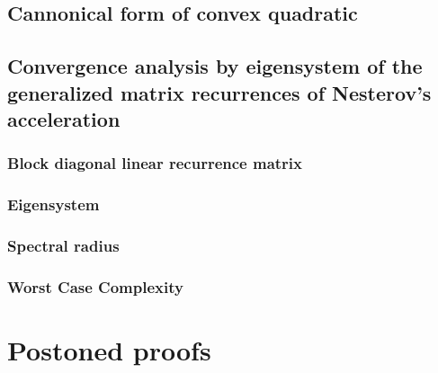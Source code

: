 \documentclass[12pt]{article}
\begin{document}
    \subsection{Cannonical form of convex quadratic}\label{sec:cannonical-convex-quadratic}
        
    
    \subsection{Convergence analysis by eigensystem of the generalized matrix recurrences of Nesterov's acceleration}\label{sec:convergence-by-eigensystem}
        \subsubsection{Block diagonal linear recurrence matrix}
        \subsubsection{Eigensystem}
        \subsubsection{Spectral radius}
        \subsubsection{Worst Case Complexity}








\appendix
\section{Postoned proofs}
\end{document}

